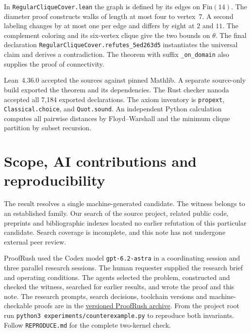\documentclass[11pt]{article}
\begin{document}
In \texttt{RegularCliqueCover.lean} the graph is defined by its edges on
$\mathrm{Fin}(14)$. The diameter proof constructs walks of length at most
four to vertex~$7$. A second labeling changes by at most one per edge and
differs by eight at $2$ and $11$. The complement coloring and its six-vertex
clique give the two bounds on $\theta$. The final declaration
\texttt{RegularCliqueCover.refutes\_5ed263d5} instantiates the universal
claim and derives a contradiction. The theorem with suffix
\texttt{\_on\_domain} also supplies the proof of connectivity.

Lean~4.36.0 accepted the sources against pinned Mathlib. A separate
source-only build exported the theorem and its dependencies. The Rust checker
nanoda accepted all 7,184 exported declarations. The axiom inventory is
\texttt{propext}, \texttt{Classical.choice}, and \texttt{Quot.sound}.
An independent Python calculation computes all pairwise distances by
Floyd--Warshall and the minimum clique partition by subset recursion.

\section{Scope, AI contributions and reproducibility}
The result resolves a single machine-generated candidate. The witness belongs
to an established family. Our search of the source project, related public
code, preprints and bibliographic indexes located no earlier refutation of
this particular candidate. Search coverage is incomplete, and this note
has not undergone external peer review.

ProofRush used the Codex model \texttt{gpt-6.2-astra} in a coordinating
session and three parallel research sessions. The human requester supplied
the research brief and operating conditions. The agents selected the problem,
constructed and checked the witness, searched for earlier results, and wrote
the proof and this note. The research prompts, search decisions, toolchain
versions and machine-checkable proofs are in the
\href{https://github.com/yoshi0703/ProofRush/releases/tag/v1.0.0}{versioned ProofRush archive}. From the project
root run \texttt{python3 experiments/counterexample.py} to reproduce both
invariants. Follow \texttt{REPRODUCE.md} for the complete two-kernel check.
\end{document}
